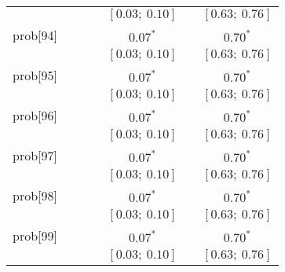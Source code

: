 \begin{table}
\begin{center}
\begin{tabular}{l c c c c c c }
          &                           &                           &                           & $[0.03;\ 0.10]$         &                           & $[0.63;\ 0.76]$       \\
prob[94]  &                           &                           &                           & $0.07^{*}$              &                           & $0.70^{*}$            \\
          &                           &                           &                           & $[0.03;\ 0.10]$         &                           & $[0.63;\ 0.76]$       \\
prob[95]  &                           &                           &                           & $0.07^{*}$              &                           & $0.70^{*}$            \\
          &                           &                           &                           & $[0.03;\ 0.10]$         &                           & $[0.63;\ 0.76]$       \\
prob[96]  &                           &                           &                           & $0.07^{*}$              &                           & $0.70^{*}$            \\
          &                           &                           &                           & $[0.03;\ 0.10]$         &                           & $[0.63;\ 0.76]$       \\
prob[97]  &                           &                           &                           & $0.07^{*}$              &                           & $0.70^{*}$            \\
          &                           &                           &                           & $[0.03;\ 0.10]$         &                           & $[0.63;\ 0.76]$       \\
prob[98]  &                           &                           &                           & $0.07^{*}$              &                           & $0.70^{*}$            \\
          &                           &                           &                           & $[0.03;\ 0.10]$         &                           & $[0.63;\ 0.76]$       \\
prob[99]  &                           &                           &                           & $0.07^{*}$              &                           & $0.70^{*}$            \\
          &                           &                           &                           & $[0.03;\ 0.10]$         &                           & $[0.63;\ 0.76]$       \\

\end{tabular}
\end{center}
\end{table}
